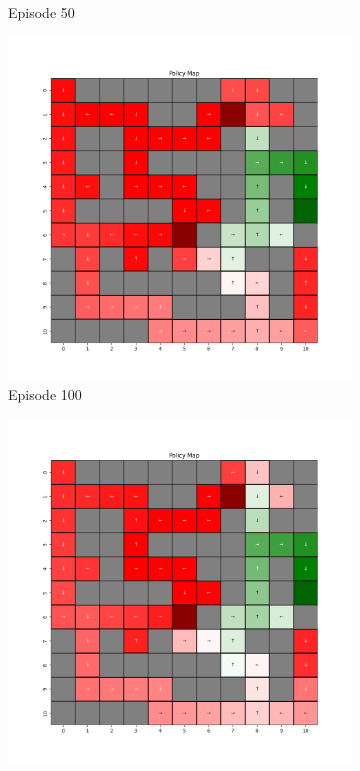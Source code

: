 \documentclass{assignment}
\begin{document}
\begin{figure}[H]
\begin{subfigure}{0.3\textwidth}
    \caption{Episode 50}
    \end{subfigure}\hfill
    \begin{subfigure}{0.3\textwidth}
        \includegraphics[width=\textwidth]{figures/policy_q/alpha_sweep/policy_alpha_0.5_gamma_0.95_epsilon_0.2_iteration_100.png}
    \caption{Episode 100}
    \end{subfigure}
    \begin{subfigure}{0.3\textwidth}
        \includegraphics[width=\textwidth]{figures/policy_q/alpha_sweep/policy_alpha_0.5_gamma_0.95_epsilon_0.2_iteration_1000.png}

\end{subfigure}
\end{figure}
\end{document}
